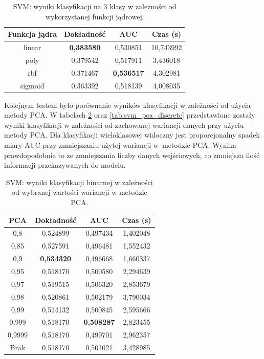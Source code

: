 \documentclass[a4paper, twoside, 11pt, openright]{article}
\begin{document}
\begin{table}[H]
    \centering
    \begin{tabular}{|c|c|c|c|}
    \hline
        \textbf{Funkcja jądra} & \textbf{Dokładność} & \textbf{AUC} & \textbf{Czas (s)} \\ \hline
linear  &  \textbf{0,383580} &  0,530851 &   10,743992 \\ \hline
poly    &  0,379542 &  0,517911 &    3,436018 \\ \hline
rbf     &  0,371467 &  \textbf{0,536517} &    4,302981 \\ \hline
sigmoid &  0,363392 &  0,518139 &    4,008035 \\ \hline
    \end{tabular}
    \caption{SVM: wyniki klasyfikacji na 3 klasy w zależności od wykorzystanej funkcji jądrowej.}
    \label{tab:svm_kernel_discrete}
\end{table}


Kolejnym testem było porównanie wyników klasyfikacji w zależności od użycia metody PCA. W tabelach \ref{tab:svm_pca_binary} oraz \ref{tab:svm_pca_discrete} przedstawione zostały wyniki klasyfikacji w zależności od zachowanej wariancji danych przy użyciu metody PCA. Dla klasyfikacji wieloklasowej widoczny jest proporcjonalny spadek miary AUC przy zmniejszaniu użytej wariancji w~metodzie PCA. Wynika prawdopodobnie to ze zmniejszania liczby danych wejściowych, co zmniejsza ilość informacji przekazywanych do modelu.


\begin{table}[H]
    \centering
    \begin{tabular}{|c|c|c|c|}
    \hline
        \textbf{PCA} & \textbf{Dokładność} &  \textbf{AUC} &  \textbf{Czas (s)} \\ \hline
0,8                &  0,524899 &  0,497434 &    1,402048 \\ \hline
0,85               &  0,527591 &  0,496481 &    1,552432 \\ \hline
0,9                &  \textbf{0,534320} &  0,496668 &    1,660337 \\ \hline
0,95               &  0,518170 &  0,500580 &    2,294639 \\ \hline
0,97               &  0,519515 &  0,506320 &    2,853679 \\ \hline
0,98               &  0,520861 &  0,502179 &    3,790034 \\ \hline
0,99               &  0,514132 &  0,500845 &    2,595666 \\ \hline
0,999 				&  0,518170 &  \textbf{0,508287} &    2,823455 \\ \hline
0,9999             &  0,518170 &  0,499701 &    2,962357 \\ \hline
Brak                &  0,518170 &  0,501021 &    3,428985 \\ \hline
    \end{tabular}
    \caption{SVM: wyniki klasyfikacji binarnej w zależności od wybranej wartości wariancji w metodzie PCA.}
    \label{tab:svm_pca_binary}
\end{table}
\end{document}
